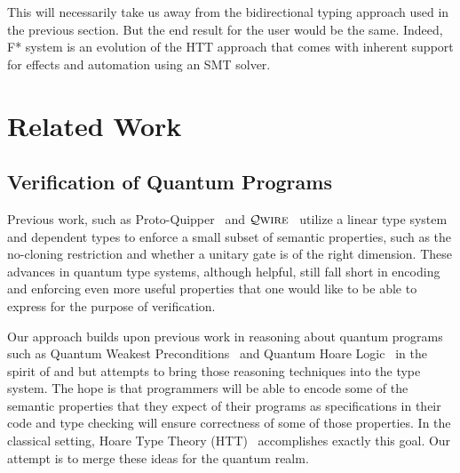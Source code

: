 \documentclass[acmsmall,nonacm,timestamp,review=false,anonymous=false]{acmart}
\newcommand{\qwire}{\ensuremath{\mathcal{Q}\textsc{wire}}\xspace}
\begin{document}
This will necessarily take us away from the bidirectional typing approach used in the previous section. But the end result for the user would be the same. Indeed, F* system is an evolution of the HTT approach that comes with inherent support for effects and automation using an SMT solver.




\section{Related Work}
\label{sec:related}


\subsection{Verification of Quantum Programs}
Previous work, such as Proto-Quipper~\cite{ross_algebraic_2015,rios_categorical_2017} and \qwire~\cite{paykin_qwire:_2017,rand_qwire_2017,rand_formally_2018} utilize a linear type system and dependent types to enforce a small subset of semantic properties, such as the no-cloning restriction and whether a unitary gate is of the right dimension. These advances in quantum type systems, although helpful, still fall short in encoding and enforcing even more useful properties that one would like to be able to express for the purpose of verification.

Our approach builds upon previous work in reasoning about quantum programs such as Quantum Weakest Preconditions~\cite{dhondt_quantum_2006} and Quantum Hoare Logic~\cite{ying_floydhoare_2012} in the spirit of \citet{hoare_axiomatic_1969} and \citet{dijkstra_discipline_1976} but attempts to bring those reasoning techniques into the type system. The hope is that programmers will be able to encode some of the semantic properties that they expect of their programs as specifications in their code and type checking will ensure correctness of some of those properties. In the classical setting, Hoare Type Theory (HTT)~\cite{nanevski_hoare_2008} accomplishes exactly this goal. Our attempt is to merge these ideas for the quantum realm.
\end{document}
